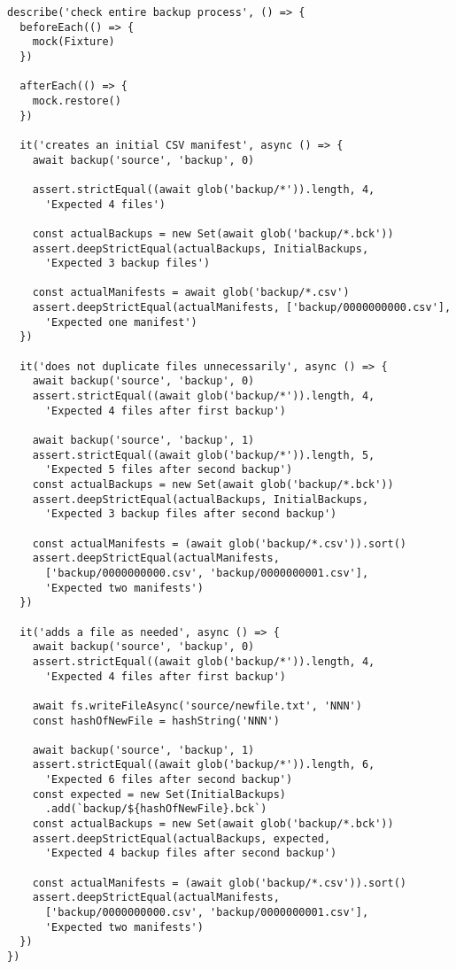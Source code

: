 \documentclass[krantzl]{krantz}
\begin{document}
\begin{lstlisting}[frame=single,frameround=tttt]
describe('check entire backup process', () => {
  beforeEach(() => {
    mock(Fixture)
  })

  afterEach(() => {
    mock.restore()
  })

  it('creates an initial CSV manifest', async () => {
    await backup('source', 'backup', 0)

    assert.strictEqual((await glob('backup/*')).length, 4,
      'Expected 4 files')

    const actualBackups = new Set(await glob('backup/*.bck'))
    assert.deepStrictEqual(actualBackups, InitialBackups,
      'Expected 3 backup files')

    const actualManifests = await glob('backup/*.csv')
    assert.deepStrictEqual(actualManifests, ['backup/0000000000.csv'],
      'Expected one manifest')
  })

  it('does not duplicate files unnecessarily', async () => {
    await backup('source', 'backup', 0)
    assert.strictEqual((await glob('backup/*')).length, 4,
      'Expected 4 files after first backup')

    await backup('source', 'backup', 1)
    assert.strictEqual((await glob('backup/*')).length, 5,
      'Expected 5 files after second backup')
    const actualBackups = new Set(await glob('backup/*.bck'))
    assert.deepStrictEqual(actualBackups, InitialBackups,
      'Expected 3 backup files after second backup')

    const actualManifests = (await glob('backup/*.csv')).sort()
    assert.deepStrictEqual(actualManifests,
      ['backup/0000000000.csv', 'backup/0000000001.csv'],
      'Expected two manifests')
  })

  it('adds a file as needed', async () => {
    await backup('source', 'backup', 0)
    assert.strictEqual((await glob('backup/*')).length, 4,
      'Expected 4 files after first backup')

    await fs.writeFileAsync('source/newfile.txt', 'NNN')
    const hashOfNewFile = hashString('NNN')

    await backup('source', 'backup', 1)
    assert.strictEqual((await glob('backup/*')).length, 6,
      'Expected 6 files after second backup')
    const expected = new Set(InitialBackups)
      .add(`backup/${hashOfNewFile}.bck`)
    const actualBackups = new Set(await glob('backup/*.bck'))
    assert.deepStrictEqual(actualBackups, expected,
      'Expected 4 backup files after second backup')

    const actualManifests = (await glob('backup/*.csv')).sort()
    assert.deepStrictEqual(actualManifests,
      ['backup/0000000000.csv', 'backup/0000000001.csv'],
      'Expected two manifests')
  })
})
\end{lstlisting}
\end{document}
